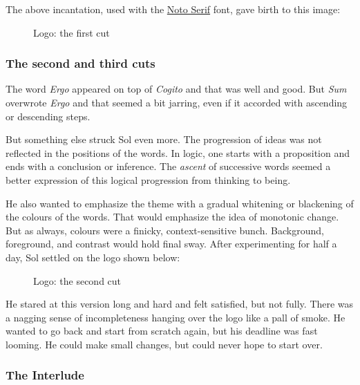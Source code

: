 \documentclass[
  a4paper,
]{article}
\begin{document}
The above incantation, used with the
\href{https://fonts.google.com/specimen/Noto+Serif}{Noto Serif} font,
gave birth to this image:

\begin{figure}
\centering

\caption{Logo: the first cut}
\end{figure}

\hypertarget{the-second-and-third-cuts}{%
\subsubsection{The second and third
cuts}\label{the-second-and-third-cuts}}

The word \emph{Ergo} appeared on top of \emph{Cogito} and that was well
and good. But \emph{Sum} overwrote \emph{Ergo} and that seemed a bit
jarring, even if it accorded with ascending or descending steps.

But something else struck Sol even more. The progression of ideas was
not reflected in the positions of the words. In logic, one starts with a
proposition and ends with a conclusion or inference. The \emph{ascent}
of successive words seemed a better expression of this logical
progression from thinking to being.

He also wanted to emphasize the theme with a gradual whitening or
blackening of the colours of the words. That would emphasize the idea of
monotonic change. But as always, colours were a finicky,
context-sensitive bunch. Background, foreground, and contrast would hold
final sway. After experimenting for half a day, Sol settled on the logo
shown below:

\begin{figure}
\centering

\caption{Logo: the second cut}
\end{figure}

He stared at this version long and hard and felt satisfied, but not
fully. There was a nagging sense of incompleteness hanging over the logo
like a pall of smoke. He wanted to go back and start from scratch again,
but his deadline was fast looming. He could make small changes, but
could never hope to start over.

\hypertarget{the-interlude}{%
\subsubsection{The Interlude}\label{the-interlude}}
\end{document}

